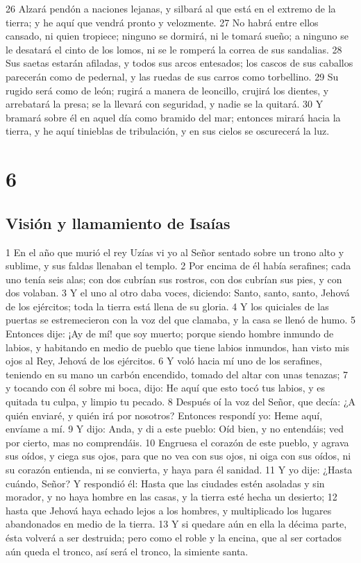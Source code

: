26 Alzará pendón a naciones lejanas, y silbará al que está en el extremo de la tierra; y he aquí que vendrá pronto y velozmente.
27 No habrá entre ellos cansado, ni quien tropiece; ninguno se dormirá, ni le tomará sueño; a ninguno se le desatará el cinto de los lomos, ni se le romperá la correa de sus sandalias.
28 Sus saetas estarán afiladas, y todos sus arcos entesados; los cascos de sus caballos parecerán como de pedernal, y las ruedas de sus carros como torbellino.
29 Su rugido será como de león; rugirá a manera de leoncillo, crujirá los dientes, y arrebatará la presa; se la llevará con seguridad, y nadie se la quitará.
30 Y bramará sobre él en aquel día como bramido del mar; entonces mirará hacia la tierra, y he aquí tinieblas de tribulación, y en sus cielos se oscurecerá la luz.

\chapter{6}

\section*{Visión y llamamiento de Isaías}

1 En el año que murió el rey Uzías vi yo al Señor sentado sobre un trono alto y sublime, y sus faldas llenaban el templo.
2 Por encima de él había serafines; cada uno tenía seis alas; con dos cubrían sus rostros, con dos cubrían sus pies, y con dos volaban.
3 Y el uno al otro daba voces, diciendo: Santo, santo, santo, Jehová de los ejércitos; toda la tierra está llena de su gloria.
4 Y los quiciales de las puertas se estremecieron con la voz del que clamaba, y la casa se llenó de humo. 
5 Entonces dije: ¡Ay de mí! que soy muerto; porque siendo hombre inmundo de labios, y habitando en medio de pueblo que tiene labios inmundos, han visto mis ojos al Rey, Jehová de los ejércitos.
6 Y voló hacia mí uno de los serafines, teniendo en su mano un carbón encendido, tomado del altar con unas tenazas;
7 y tocando con él sobre mi boca, dijo: He aquí que esto tocó tus labios, y es quitada tu culpa, y limpio tu pecado.
8 Después oí la voz del Señor, que decía: ¿A quién enviaré, y quién irá por nosotros? Entonces respondí yo: Heme aquí, envíame a mí.
9 Y dijo: Anda, y di a este pueblo: Oíd bien, y no entendáis; ved por cierto, mas no comprendáis.
10 Engruesa el corazón de este pueblo, y agrava sus oídos, y ciega sus ojos, para que no vea con sus ojos, ni oiga con sus oídos, ni su corazón entienda, ni se convierta, y haya para él sanidad. 
11 Y yo dije: ¿Hasta cuándo, Señor? Y respondió él: Hasta que las ciudades estén asoladas y sin morador, y no haya hombre en las casas, y la tierra esté hecha un desierto;
12 hasta que Jehová haya echado lejos a los hombres, y multiplicado los lugares abandonados en medio de la tierra.
13 Y si quedare aún en ella la décima parte, ésta volverá a ser destruida; pero como el roble y la encina, que al ser cortados aún queda el tronco, así será el tronco, la simiente santa.

